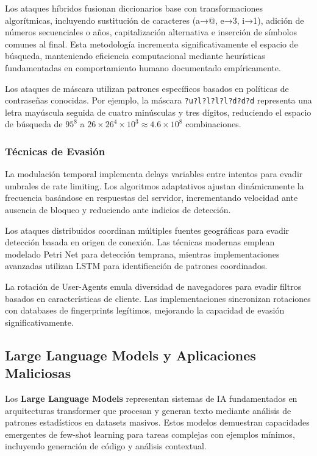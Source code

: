 Los ataques híbridos fusionan diccionarios base con transformaciones algorítmicas, incluyendo sustitución de caracteres (a→@, e→3, i→1), adición de números secuenciales o años, capitalización alternativa e inserción de símbolos comunes al final. Esta metodología incrementa significativamente el espacio de búsqueda, manteniendo eficiencia computacional mediante heurísticas fundamentadas en comportamiento humano documentado empíricamente.

Los ataques de máscara utilizan patrones específicos basados en políticas de contraseñas conocidas. Por ejemplo, la máscara \texttt{?u?l?l?l?l?d?d?d} representa una letra mayúscula seguida de cuatro minúsculas y tres dígitos, reduciendo el espacio de búsqueda de \(95^8\) a \(26 \times 26^4 \times 10^3 \approx 4.6 \times 10^8\) combinaciones.

\subsubsection{Técnicas de Evasión}

La modulación temporal implementa delays variables entre intentos para evadir umbrales de rate limiting. Los algoritmos adaptativos ajustan dinámicamente la frecuencia basándose en respuestas del servidor, incrementando velocidad ante ausencia de bloqueo y reduciendo ante indicios de detección.

Los ataques distribuidos coordinan múltiples fuentes geográficas para evadir detección basada en origen de conexión. Las técnicas modernas \cite{Tiwari2023BruteForce} emplean modelado Petri Net para detección temprana, mientras implementaciones avanzadas \cite{Sharma2024BruSSH} utilizan LSTM para identificación de patrones coordinados.

La rotación de User-Agents emula diversidad de navegadores para evadir filtros basados en características de cliente. Las implementaciones sincronizan rotaciones con databases de fingerprints legítimos, mejorando la capacidad de evasión significativamente.

\subsection{Large Language Models y Aplicaciones Maliciosas}

Los \textbf{Large Language Models} representan sistemas de IA fundamentados en arquitecturas transformer que procesan y generan texto mediante análisis de patrones estadísticos en datasets masivos. Estos modelos \cite{Brown2020Language} demuestran capacidades emergentes de few-shot learning para tareas complejas con ejemplos mínimos, incluyendo generación de código y análisis contextual.

